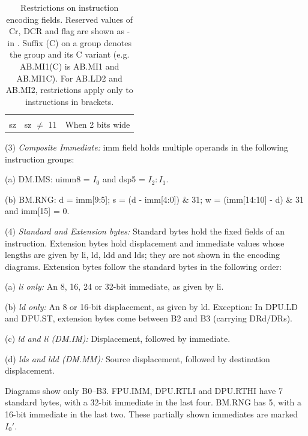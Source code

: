 \begin{table}
\begin{center}
\begin{tabular}{lll}
                 &                                                  &                                                   \\
sz               & sz $\ne$ 11                                      & When 2 bits wide                                  \\ \hline
\end{tabular}
\end{center}
\captionsetup{font=scriptsize, labelfont=scriptsize}
\caption{Restrictions on instruction encoding fields. Reserved values of Cr, DCR and flag are shown as - in 
. Suffix (C) on a group denotes the group and its C 
variant (e.g. AB.MI1(C) is AB.MI1 and AB.MI1C). For AB.LD2 and AB.MI2, restrictions apply only to 
instructions in brackets.}
\end{table}

\levelone
(3) \emph{Composite Immediate:} %
imm field holds multiple operands in the following instruction groups:

    \leveltwo
    (a) DM.IMS: uimm8 = $I_0$ and dsp5 = $I_2:I_1$.

    \leveltwo
    (b) BM.RNG: d = imm[9:5]; s = (d - imm[4:0]) \& 31; w = (imm[14:10] - d) \& 31 and imm[15] = 0.

\levelone
(4) \emph{Standard and Extension bytes:} %
Standard bytes hold the fixed fields of an instruction. Extension bytes hold displacement and immediate values whose 
lengths are given by li, ld, ldd and lds; they are not shown in the encoding diagrams. Extension bytes follow the 
standard bytes in the following order:

    \leveltwo
    (a) \emph{li only:} %
    An 8, 16, 24 or 32-bit immediate, as given by li.

    (b) \emph{ld only:} %
    An 8 or 16-bit displacement, as given by ld. Exception: In DPU.LD and DPU.ST, extension bytes come between B2 
    and B3 (carrying DRd/DRs).

    (c) \emph{ld and li (DM.IM):} %
    Displacement, followed by immediate.

    (d) \emph{lds and ldd (DM.MM):} %
    Source displacement, followed by destination displacement.

\levelone
Diagrams show only B0--B3. FPU.IMM, DPU.RTLI and DPU.RTHI have 7 standard bytes, with a 32-bit immediate in the 
last four. BM.RNG has 5, with a 16-bit immediate in the last two. These partially shown immediates are marked 
$I_0'$.


